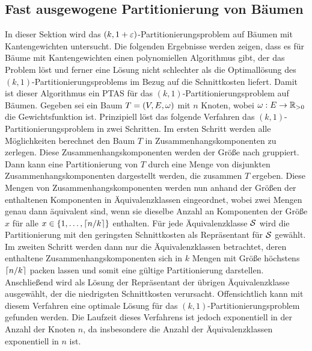 \subsection{Fast ausgewogene Partitionierung von Bäumen}\label{sec:treepartitioning}
In dieser Sektion wird das $(k,1+\eps)$\hyp Partitionierungsproblem auf Bäumen mit Kantengewichten untersucht. 
Die folgenden Ergebnisse werden zeigen, dass es für Bäume mit Kantengewichten einen polynomiellen Algorithmus gibt, der das Problem löst und ferner eine Lösung nicht schlechter als die Optimallösung des $(k,1)$\hyp Partitionierungsproblems im Bezug auf die Schnittkosten liefert.
Damit ist dieser Algorithmus ein  PTAS für das $(k,1)$\hyp Partitionierungsproblem auf Bäumen. 
Gegeben sei ein Baum $T = (V,E,\weight)$ mit $n$ Knoten, wobei $\weight : E \rightarrow \reals_{> 0}$ die Gewichtsfunktion ist.
Prinzipiell löst das folgende Verfahren das $(k,1)$\hyp Partitionierungsproblem in zwei Schritten.
Im ersten Schritt werden alle Möglichkeiten berechnet den Baum $T$ in Zusammenhangskomponenten zu zerlegen.
Diese Zusammenhangskomponenten werden der Größe nach gruppiert.
Dann kann eine Partitionierung von $T$ durch eine Menge von disjunkten Zusammenhangskomponenten dargestellt werden, die zusammen $T$ ergeben. 
Diese Mengen von Zusammenhangskomponenten werden nun anhand der Größen der enthaltenen Komponenten in Äquivalenzklassen eingeordnet, wobei zwei Mengen genau dann äquivalent sind, wenn sie dieselbe Anzahl an Komponenten der Größe $x$ für alle $x \in \{1, \ldots, \ceil*{n/k}\}$ enthalten.
Für jede Äquivalenzklasse $\calS$ wird die Partitionierung mit den geringsten Schnittkosten als Repräsentant für $\calS$ gewählt.
Im zweiten Schritt werden dann nur die Äquivalenzklassen betrachtet, deren enthaltene Zusammenhangskomponenten sich in $k$ Mengen mit Größe höchstens $\ceil*{n/k}$ packen lassen und somit eine gültige Partitionierung darstellen.
Anschließend wird als Lösung der Repräsentant der übrigen Äquivalenzklasse ausgewählt, der die niedrigsten Schnittkosten verursacht.
Offensichtlich kann mit diesem Verfahren eine optimale Lösung für das $(k,1)$\hyp Partitionierungsproblem gefunden werden.
Die Laufzeit dieses Verfahrens ist jedoch exponentiell in der Anzahl der Knoten $n$, da insbesondere die Anzahl der Äquivalenzklassen exponentiell in $n$ ist.

